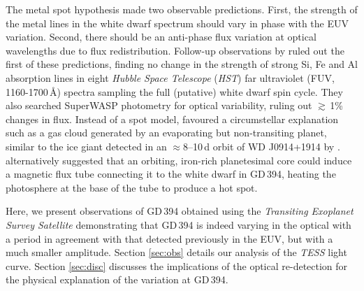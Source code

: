 \documentclass{aastex63}
\begin{document}
The metal spot hypothesis made two observable predictions. First, the strength of the metal lines in the white dwarf spectrum should vary in phase with the EUV variation. Second, there should be an anti-phase flux variation at optical wavelengths due to flux redistribution. Follow-up observations  by \citet{wilsonetal19-1} ruled out the first of these predictions, finding no change in the strength of strong Si, Fe and Al absorption lines in eight \textit{Hubble Space Telescope} (\textit{HST}) far ultraviolet (FUV, 1160-1700\,\AA) spectra sampling the full (putative) white dwarf spin cycle. They also searched SuperWASP photometry for optical variability, ruling out $\gtrsim$\,1\% changes in flux. Instead of a spot model, \citet{wilsonetal19-1} favoured a circumstellar explanation such as a gas cloud generated by an evaporating but non-transiting planet, similar to the ice giant detected in an $\approx$8--10\,d orbit of WD J0914+1914 by \citet{gaensickeetal19-1}. \citet{veras+wolszczan19-1} alternatively suggested that an orbiting, iron-rich planetesimal core could induce a magnetic flux tube connecting it to the white dwarf in GD\,394, heating the photosphere at the base of the tube to produce a hot spot. 
 
Here, we present observations of GD\,394 obtained using the {\em Transiting Exoplanet Survey Satellite} \citep[\textit{TESS},][]{rickeretal14-1} demonstrating that GD\,394 is indeed varying in the optical with a period in agreement with that detected previously in the EUV, but with a much smaller amplitude. Section \ref{sec:obs} details our analysis of the \textit{TESS} light curve. Section \ref{sec:disc} discusses the implications of the optical re-detection for the physical explanation of the variation at GD\,394. 
\end{document}
